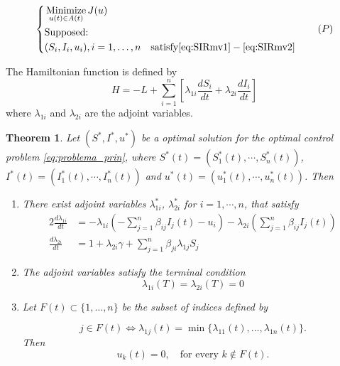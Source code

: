 \documentclass[a4paper,10pt]{article}
\newtheorem{thm}{Theorem}[section]
\theoremstyle{remark}
\begin{document}
\begin{equation}\label{eq:problema_prin}
 \left\{
 \begin{split}
 &\operatornamewithlimits{Minimize}_{ u(t)\in A(t)}J( u) 
\\
 &\text{Supposed: }\\
 & (S_i,I_i, u_i),i=1,\ldots,n\quad\text{satisfy}  \eqref{eq:SIRmv1}-\eqref{eq:SIRmv2}
 \end{split} \right.\tag{$P$}
\end{equation}


The Hamiltonian function is defined by
\[
H=-L+\sum_{i=1}^{n} \left[\lambda_{1i}\frac{d S_{i}}{dt}+\lambda_{2i}\frac{d I_{i}}{dt}\right] 
\]
where $\lambda_{1i}$ and $\lambda_{2i}$ are the adjoint variables.

\begin{thm}
Let $(S^*,I^{*},  u^{*})$ be a optimal solution for the optimal control problem \eqref{eq:problema_prin}, where $S^{*}(t)=(S_{1}^{*}(t),\cdots, S_{n}^{*}(t))$, $I^{*}(t)=(I_{1}^{*}(t),\cdots, I_{n}^{*}(t))$ and $ u^{*}(t)=( u_{1}^{*}(t),\cdots,  u_{n}^{*}(t))$. Then

\begin{enumerate}


\item There exist adjoint variables $\lambda_{1i}^*$, $\lambda_{2i}^*$  for $i=1,\cdots, n$, that satisfy
\begin{alignat}{2}
\frac{d\lambda_{1i}}{dt}&=-\lambda_{1i}\left(-\sum_{j=1}^{n} \beta_{i j} I_{j}(t)- u_{i}\right)-\lambda_{2i}\left(\sum_{j=1}^{n} \beta_{i j} I_{j}(t)\right) \label{lambda1} \\
\frac{d\lambda_{2i}}{dt}&=1+\lambda_{2i}\gamma +\sum_{j=1}^n\beta_{ji}\lambda_{1j}S_j \label{lambda2} 
\end{alignat}
\item The adjoint variables satisfy   the terminal condition
\begin{equation}\label{transver}
\lambda_{1i}(T)=\lambda_{2i}(T)=0
\end{equation}

\item\label{it:3} Let $F(t)\subset \{1,\ldots,n\}$  be the subset of indices defined by

 
$$j\in F(t) \Longleftrightarrow \lambda_{1j}(t) = \min\{\lambda_{11}(t),\ldots, \lambda_{1n}(t)\}.$$
Then 
\begin{equation}\label{eq:cond_cont}
     u_k(t)=0,\quad\text{for every } k\notin F(t).
\end{equation}


\end{enumerate}
\end{thm}
\end{document}
